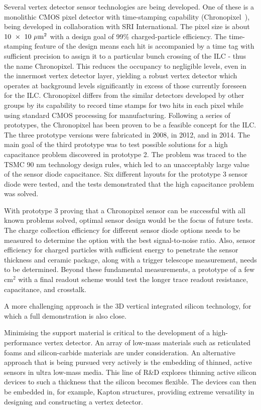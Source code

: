 Several vertex detector sensor technologies are being developed.  One of these is a 
monolithic CMOS pixel detector with time-stamping capability (Chronopixel~\cite{Sinev:2015iwr}),
being developed in collaboration with SRI International. 
The pixel size is about  $10~\times~10~\mu\mathrm{m}^2$ with a design goal of 99\% charged-particle
 efficiency.
The time-stamping feature of the design means each hit is accompanied by a time tag with sufficient precision to assign it to a particular bunch crossing of
the ILC - thus the name Chronopixel. This reduces the occupancy to negligible levels, even in the
innermost vertex detector layer, yielding a robust vertex detector which operates at background
levels significantly in excess of those currently foreseen for the ILC. Chronopixel differs from the
similar detectors developed by other groups by its capability to record time stamps for two hits in
each pixel while using standard CMOS processing for manufacturing. 
Following a series of prototypes, the Chronopixel has been proven to be
a feasible concept for the ILC. The three prototype versions
were fabricated in 2008, in 2012, and in 2014.
The main goal of the third prototype was to test possible solutions for a high capacitance problem
discovered in prototype 2. The problem was traced to the TSMC 90 nm technology design rules,
which led to an unacceptably large value of the sensor diode capacitance. Six different layouts
for the prototype 3 sensor diode were tested, and the tests demonstrated that the high capacitance
problem was solved.

With prototype 3 proving that a Chronopixel sensor can be successful with all known problems solved, optimal sensor design would be the focus of future tests.
The charge collection efficiency for different sensor diode options needs to be measured to determine
the option with the best signal-to-noise ratio. Also, sensor efficiency for charged particles with sufficient energy to penetrate the sensor thickness and ceramic package, along with a trigger telescope measurement, needs to be determined. Beyond these fundamental measurements, a prototype of a few cm$^2$ with a final readout scheme would
test the longer trace readout resistance, capacitance, and crosstalk.

A more challenging approach is the 3D vertical integrated silicon technology, for which a full 
demonstration is also close.




Minimising the support material is critical to the development of a high-performance 
vertex detector. An array of 
low-mass materials such as reticulated foams and silicon-carbide
materials are under consideration. An alternative approach that is being pursued very actively is the
embedding of thinned, active sensors in ultra low-mass media. This line of R\&D
explores thinning active silicon devices to such a thickness that the silicon
becomes flexible. The devices can then be embedded in, for example, Kapton
structures, providing extreme versatility in designing and constructing a vertex
detector.

